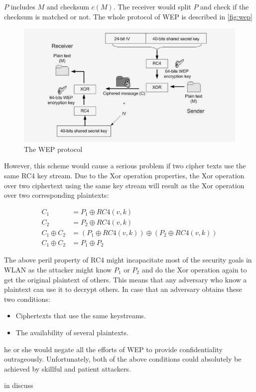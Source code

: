 	
$P$ includes $M$ and checksum $c(M)$. The receiver would split $P$ and check if the checksum is matched or not. The whole protocol of \ac{WEP} is described in \autoref{fig:wep}
\begin{figure}
	\includegraphics[scale=0.35]{images/wep.png}
	\caption{The WEP protocol \cite{al2006ieee}}
	\label{fig:wep}
\end{figure}

However, this scheme would cause a serious problem if two cipher texts use the same \ac{RC4} key stream. Due to the \ac{Xor} operation properties, the \ac{Xor} operation over two ciphertext using the same key stream will result as the \ac{Xor} operation over two corresponding plaintexts:

\begin{align}
	C_1 &= P_1 \oplus RC4(v,k)\\
	C_2 &= P_2 \oplus RC4(v,k) \\
	C_1 \oplus C_2 &= (P_1 \oplus RC4(v,k)) \oplus (P_2 \oplus RC4(v,k))\\
	C_1 \oplus C_2 &= P_1 \oplus P_2
\end{align}

The above peril property of \ac{RC4} might incapacitate most of the security goals in \ac{WLAN} as the attacker might know $P_1$ or $P_2$ and do the \ac{Xor} operation again to get the original plaintext of others. This means that any adversary who know a plaintext can use it to decrypt others. In case that an adversary obtains these two conditions:
\begin{itemize}
	\item Ciphertexts that use the same keystreams.
	\item The availability of several plaintexts.
\end{itemize}
he or she would negate all the efforts of \ac{WEP} to provide confidentiality  outrageously. Unfortunately, both of the above conditions could absolutely be achieved by skillful and patient attackers.

\citeauthor{borisov2001intercepting} in \cite{borisov2001intercepting} discuss